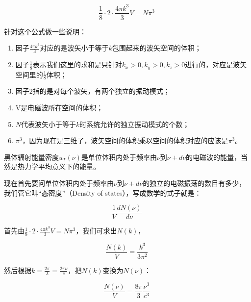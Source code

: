 \begin{equation}
\frac{1}{8} \cdot 2 \cdot \frac{4 \pi k^3}{3} V = N \pi^3~
\end{equation}

针对这个公式做一些说明：

\begin{enumerate}
\item 

因子$\frac{4 \pi k^3}{3}$对应的是波矢小于等于$k$包围起来的波矢空间的体积；

\item

因子$\frac{1}{8}$表示我们这里的求和是只针对$k_x >0, k_y > 0, k_z >0 $进行的，对应是波矢空间里的$\frac{1}{8}$体积；

\item 

因子$2$指的是对每个波矢，有两个独立的振动模式；

\item

V是电磁波所在空间的体积；

\item

$N$代表波矢小于等于$k$时系统允许的独立振动模式的个数；

\item

$\pi^3$，因为现在是三维了，波矢空间的体积乘以空间的体积对应的应该是$\pi^3$。

\end{enumerate}

黑体辐射能量密度$u_T(\nu)$是单位体积内处于频率由$\nu $到$\nu + d\nu $的电磁波的能量，当然是热力学平均意义下的能量。

现在首先要问单位体积内处于频率由$\nu $到$\nu + d\nu $的独立的电磁振荡的数目有多少，我们管它叫“态密度”（Density of states），写成数学的式子就是：

\begin{equation}
\frac{1}{V} \frac{d N (\nu)}{d \nu}~
\end{equation}

首先由$\frac{1}{8} \cdot 2 \cdot \frac{4 \pi k^3}{3} V = N \pi^3$，我们可求出$N(k)$，

\begin{equation}
\frac{N(k )}{ V } = \frac{ k^3 }{3 \pi^2}~
\end{equation}

然后根据$k = \frac{2 \pi }{ \lambda}  = \frac{2 \pi \nu}{c}$，把$N(k)$变换为$N(\nu )$：

\begin{equation}
\frac{N(\nu)  }{ V } = \frac{ 8 \pi }{ 3 } \frac{ \nu^3  } { c^3 }~
\end{equation}

